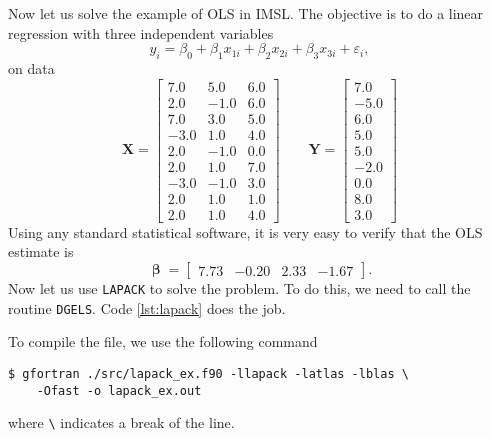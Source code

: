 \documentclass[twoside,11pt,leqno]{article}
\renewcommand{\vec}[1]{\ensuremath{\mathbf{#1}}}
\newcommand{\gvec}[1]{{\boldsymbol{#1}}}
\newcommand{\code}{\texttt}
\begin{document}
Now let us solve the example of OLS in IMSL. The objective is to do a linear regression with three independent variables
\begin{equation*}
    y_i = \beta_0 + \beta_1 x_{1i} + \beta_2 x_{2i} + \beta_3 x_{3i} + \varepsilon_i,
\end{equation*}
on data
\begin{equation*}
    \vec{X} = \begin{bmatrix}
        7.0  & 5.0  & 6.0 \\
        2.0  & -1.0 & 6.0 \\
        7.0  & 3.0  & 5.0 \\
        -3.0 & 1.0  & 4.0 \\
        2.0  & -1.0 & 0.0 \\
        2.0  & 1.0  & 7.0 \\
        -3.0 & -1.0 & 3.0 \\
        2.0  & 1.0  & 1.0 \\
        2.0  & 1.0  & 4.0 \end{bmatrix} \qquad
    \vec{Y} = \begin{bmatrix}
        7.0 \\ -5.0 \\ 6.0 \\ 5.0 \\ 5.0 \\ -2.0 \\ 0.0 \\ 8.0 \\ 3.0 \end{bmatrix}
\end{equation*}
Using any standard statistical software, it is very easy to verify that the OLS estimate is
\begin{equation*}
    \gvec{\upbeta} = \begin{bmatrix} 7.73 & -0.20 & 2.33 & -1.67 \end{bmatrix}.
\end{equation*}
Now let us use \code{LAPACK} to solve the problem. To do this, we need to call the routine \code{DGELS}. Code \ref{lst:lapack} does the job.


To compile the file, we use the following command
\begin{verbatim}
$ gfortran ./src/lapack_ex.f90 -llapack -latlas -lblas \
    -Ofast -o lapack_ex.out
\end{verbatim}
where \code{\textbackslash} indicates a break of the line.
\end{document}
